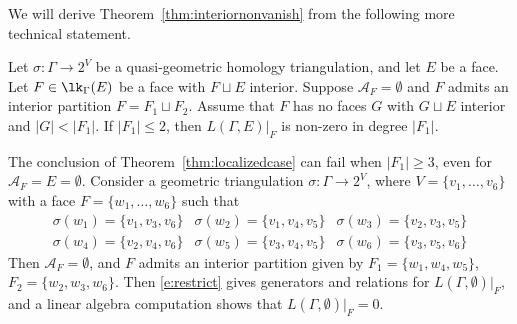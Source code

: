 We will derive Theorem~\ref{thm:interiornonvanish} from  the following more technical statement.

\begin{theorem}\label{thm:localizedcase}
Let $\sigma\colon \Gamma \to 2^V$ be a quasi-geometric homology triangulation, and let $E$ be a face. Let $F \in \lk_{\Gamma}(E)$ be a face with $F \sqcup E$ interior. Suppose $\mathcal{A}_F = \emptyset$ and $F$ admits an interior partition $F = F_1 \sqcup F_2$. Assume that $F$ has no faces $G$ with $G \sqcup E$ interior and $ \vert G \vert < \vert F_1 \vert$. If $\vert F_1 \vert \le 2$, then $L(\Gamma, E)|_{F}$ is non-zero in degree $\vert F_1 \vert$. 
\end{theorem}

\begin{example}\label{example:nonrestriction}
The conclusion of Theorem~\ref{thm:localizedcase} can fail when $\vert F_1 \vert \ge 3$, even for $\mathcal{A}_F = E = \emptyset$.  Consider a geometric triangulation $\sigma \colon \Gamma \to 2^V$, where $V = \{v_1, \ldots, v_6 \}$ with a face $F = \{w_1, \ldots, w_6\}$ such that 
\[
\begin{array}{lll}
\sigma(w_1) = \{ v_1, v_3, v_6 \} & \sigma(w_2) = \{ v_1, v_4, v_5 \} & \sigma(w_3) = \{ v_2, v_3, v_5 \} \\
\sigma(w_4) = \{ v_2, v_4, v_6 \} & \sigma(w_5) = \{ v_3, v_4, v_5 \} & \sigma(w_6) = \{ v_3, v_5, v_6 \}
\end{array}
\]
Then $\mathcal{A}_F = \emptyset$, and $F$ admits an interior partition given by $F_1 = \{w_1, w_4, w_5\}$, $F_2 = \{w_2, w_3, w_6\}$. Then \eqref{e:restrict} gives generators and relations for $L(\Gamma, \emptyset)|_{F}$, and a linear algebra computation shows that $L(\Gamma, \emptyset)|_{F} = 0$. 
\end{example}
